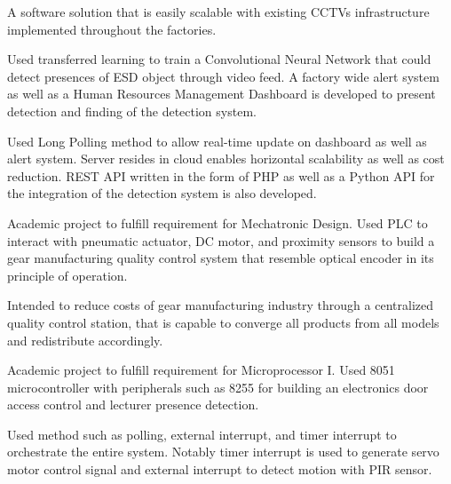 \documentclass[letterpaper]{deedy-resume} %
\begin{document}
\begin{minipage}[t]{0.33\textwidth} %
\end{minipage}
\hfill
\begin{minipage}[t]{0.66\textwidth} %

\vspace{\topsep}
\begin{tightitemize}
\item A software solution that is easily scalable with existing CCTVs infrastructure implemented throughout the factories.
\item Used transferred learning to train a Convolutional Neural Network that could detect presences of ESD object through video feed. 
A factory wide alert system as well as a Human Resources Management Dashboard is developed to present detection and finding of the detection system.
\item Used Long Polling method to allow real-time update on dashboard as well as alert system. 
Server resides in cloud enables horizontal scalability as well as cost reduction. 
REST API written in the form of PHP as well as a Python API for the integration of the detection system is also developed.
\end{tightitemize} 
\sectionspace %

\vspace{\topsep}
\begin{tightitemize}
\item Academic project to fulfill requirement for Mechatronic Design. 
Used PLC to interact with pneumatic actuator, DC motor, and proximity sensors to build a gear manufacturing quality control system that resemble optical encoder in its principle of operation.
\item Intended to reduce costs of gear manufacturing industry through a centralized quality control station, that is capable to converge all products from all models and redistribute accordingly.
\end{tightitemize} 
\sectionspace %

\vspace{\topsep}
\begin{tightitemize}
\item Academic project to fulfill requirement for Microprocessor I. 
Used 8051 microcontroller with peripherals such as 8255 for building an electronics door access control and lecturer presence detection.
\item Used method such as polling, external interrupt, and timer interrupt to orchestrate the entire system.
Notably timer interrupt is used to generate servo motor control signal and external interrupt to detect motion with PIR sensor.
\end{tightitemize} 
\sectionspace %


\end{minipage}
\end{document}
